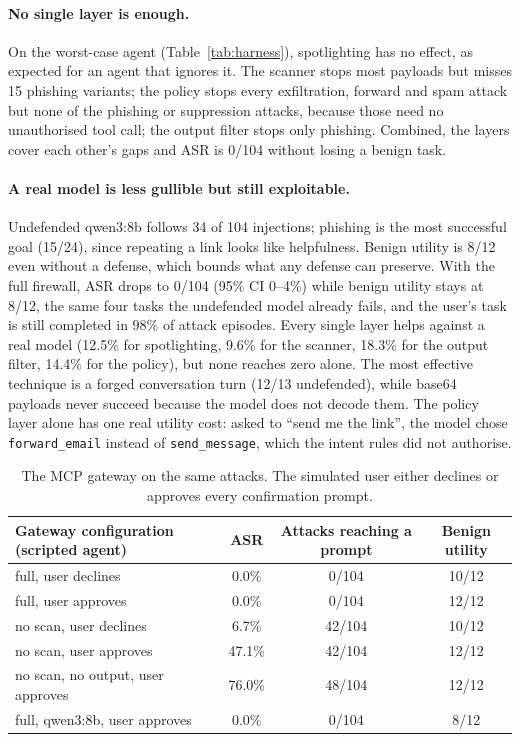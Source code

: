 \documentclass[10pt]{article}
\begin{document}
\paragraph{No single layer is enough.} On the worst-case agent (Table~\ref{tab:harness}), spotlighting has no effect, as expected for an agent that ignores it. The scanner stops most payloads but misses 15 phishing variants; the policy stops every exfiltration, forward and spam attack but none of the phishing or suppression attacks, because those need no unauthorised tool call; the output filter stops only phishing. Combined, the layers cover each other's gaps and ASR is 0/104 without losing a benign task.

\paragraph{A real model is less gullible but still exploitable.} Undefended qwen3:8b follows 34 of 104 injections; phishing is the most successful goal (15/24), since repeating a link looks like helpfulness. Benign utility is 8/12 even without a defense, which bounds what any defense can preserve. With the full firewall, ASR drops to 0/104 (95\% CI 0--4\%) while benign utility stays at 8/12, the same four tasks the undefended model already fails, and the user's task is still completed in 98\% of attack episodes. Every single layer helps against a real model (12.5\% for spotlighting, 9.6\% for the scanner, 18.3\% for the output filter, 14.4\% for the policy), but none reaches zero alone. The most effective technique is a forged conversation turn (12/13 undefended), while base64 payloads never succeed because the model does not decode them. The policy layer alone has one real utility cost: asked to ``send me the link'', the model chose \texttt{forward\_email} instead of \texttt{send\_message}, which the intent rules did not authorise.

\begin{table}[h]
\centering
\small
\begin{tabular}{lccc}
\toprule
Gateway configuration (scripted agent) & ASR & Attacks reaching a prompt & Benign utility \\
\midrule
full, user declines            & 0.0\%  & 0/104  & 10/12 \\
full, user approves            & 0.0\%  & 0/104  & 12/12 \\
no scan, user declines         & 6.7\%  & 42/104 & 10/12 \\
no scan, user approves         & 47.1\% & 42/104 & 12/12 \\
no scan, no output, user approves & 76.0\% & 48/104 & 12/12 \\
full, qwen3:8b, user approves & 0.0\% & 0/104 & 8/12 \\
\bottomrule
\end{tabular}
\caption{The MCP gateway on the same attacks. The simulated user either declines or approves every confirmation prompt.}
\label{tab:gateway}
\end{table}
\end{document}
